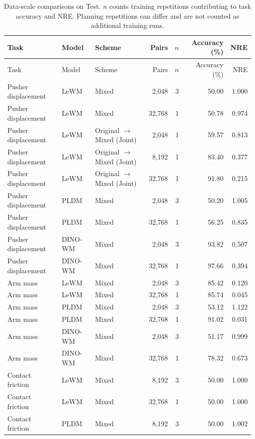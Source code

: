 \begingroup\small
\setlength{\tabcolsep}{4pt}
\begin{longtable}{@{}p{2cm}lp{4cm}rrrr@{}}
\caption{Data-scale comparisons on Test. $n$ counts training repetitions contributing to task accuracy and NRE. Planning repetitions can differ and are not counted as additional training runs.}\label{tab:data-scale}\\
\toprule
Task & Model & Scheme & Pairs & $n$ & Accuracy (\%) & NRE\\
\midrule\endfirsthead
\toprule
Task & Model & Scheme & Pairs & $n$ & Accuracy (\%) & NRE\\
\midrule\endhead
\bottomrule\endfoot
Pusher displacement & LeWM & Mixed & 2,048 & 3 & 50.00 & 1.000 \\
Pusher displacement & LeWM & Mixed & 32,768 & 1 & 50.78 & 0.974 \\
Pusher displacement & LeWM & Original $\rightarrow$ Mixed (Joint) & 2,048 & 1 & 59.57 & 0.813 \\
Pusher displacement & LeWM & Original $\rightarrow$ Mixed (Joint) & 8,192 & 1 & 83.40 & 0.377 \\
Pusher displacement & LeWM & Original $\rightarrow$ Mixed (Joint) & 32,768 & 1 & 91.80 & 0.215 \\
Pusher displacement & PLDM & Mixed & 2,048 & 3 & 50.20 & 1.005 \\
Pusher displacement & PLDM & Mixed & 32,768 & 1 & 56.25 & 0.835 \\
Pusher displacement & DINO-WM & Mixed & 2,048 & 3 & 93.82 & 0.507 \\
Pusher displacement & DINO-WM & Mixed & 32,768 & 1 & 97.66 & 0.394 \\
Arm mass & LeWM & Mixed & 2,048 & 3 & 85.42 & 0.120 \\
Arm mass & LeWM & Mixed & 32,768 & 1 & 85.74 & 0.045 \\
Arm mass & PLDM & Mixed & 2,048 & 3 & 53.12 & 1.122 \\
Arm mass & PLDM & Mixed & 32,768 & 1 & 91.02 & 0.031 \\
Arm mass & DINO-WM & Mixed & 2,048 & 3 & 51.17 & 0.999 \\
Arm mass & DINO-WM & Mixed & 32,768 & 1 & 78.32 & 0.673 \\
Contact friction & LeWM & Mixed & 8,192 & 3 & 50.00 & 1.000 \\
Contact friction & LeWM & Mixed & 32,768 & 1 & 50.00 & 1.000 \\
Contact friction & PLDM & Mixed & 8,192 & 3 & 50.00 & 1.002 \\

\end{longtable}
